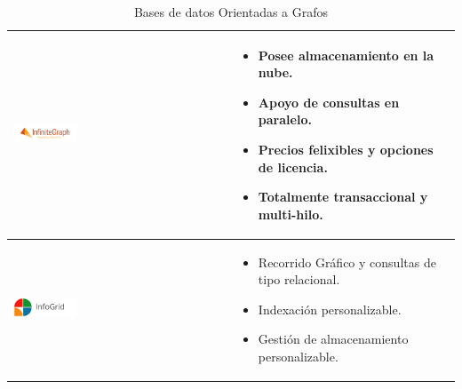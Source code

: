 \begin{table}[b!]
\begin{tabular}{|p{2cm}|ll}
        \hline
          \multicolumn{1}{|p{5cm}|}{\includegraphics[width=0.3\textwidth]{images/InfiniteGraph}} & 
          \multicolumn{1}{p{10cm}|}{
          \begin{itemize}
          \vspace{-7mm}
        \item Posee almacenamiento en la nube.
        \item Apoyo de consultas en paralelo.
        \item Precios felixibles y opciones de licencia.
        \item Totalmente transaccional y multi-hilo.
      \end{itemize}} \\ 
        \hline
          \multicolumn{1}{|p{3cm}|}{\includegraphics[width=0.3\textwidth]{images/InfoGrid}} & 
          \multicolumn{1}{p{10cm}|}{
          \begin{itemize}
          \vspace{-10mm}
        \item Recorrido Gráfico y consultas de tipo relacional.
        \item Indexación personalizable.
        \item Gestión de almacenamiento personalizable.
      \end{itemize}}\\ 
         \hline
      \end{tabular}
      \caption{Bases de datos Orientadas a Grafos}
      \label{Analisis de riesgos}
    \end{table}
\newpage
